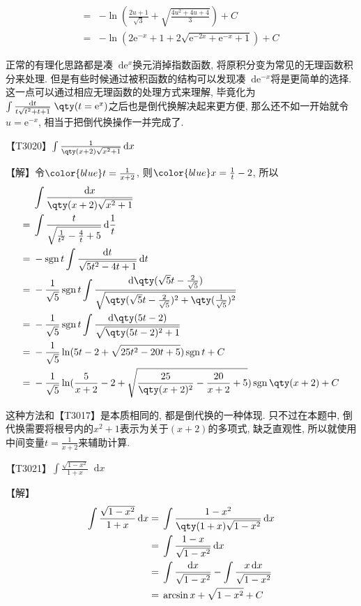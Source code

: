\documentclass{ctexbook}
\DeclareMathOperator{\sgn}{sgn}
\newcommand{\e}{\mathrm{e}}
\newcommand*{\dif}{\mathop{}\!\mathrm{d}}
\begin{document}
{\begin{align*}
={}&-\ln(\frac{2u+1}{\sqrt{3}}+\sqrt{\frac{4u^{2}+4u+4}{3}})+C\\
={}&-\ln(2\e^{-x}+1+2\sqrt{\e^{-2x}+\e^{-x}+1})+C
\end{align*}\par
{\kaishu 正常的有理化思路都是凑$\dif{\e^{x}}$换元消掉指数函数, 将原积分变为常见的无理函数积分来处理. 但是有些时候通过被积函数的结构可以发现凑$\dif{\e^{-x}}$将是更简单的选择. 这一点可以通过相应无理函数的处理方式来理解, 毕竟化为$\int\frac{\dif{t}}{t\sqrt{t^{2}+t+1}}\;\qty(t=\e^{x})$之后也是倒代换解决起来更方便, 那么还不如一开始就令$u=\e^{-x}$, 相当于把倒代换操作一并完成了. \par}
【T3020】$\int\frac{1}{\qty(x+2)\sqrt{x^{2}+1}}\dif{x}$\par
【解】令$\color{blue}t=\frac{1}{x+2}$, 则$\color{blue}x=\frac{1}{t}-2$, 所以
\begin{align*}
{}&\int\frac{\dif{x}}{\qty(x+2)\sqrt{x^{2}+1}}\\
={}&\int\frac{t}{\sqrt{\frac{1}{t^{2}}-\frac{4}{t}+5}}\dif{\frac{1}{t}}\\
={}&-\sgn{t}\int\frac{\dif{t}}{\sqrt{5t^{2}-4t+1}}\dif{t}\\
={}&-\frac{1}{\sqrt{5}}\sgn{t}\int\frac{\dif{\qty(\sqrt{5}t-\frac{2}{\sqrt{5}})}}{\sqrt{\qty(\sqrt{5}t-\frac{2}{\sqrt{5}})^{2}+\qty(\frac{1}{\sqrt{5}})^{2}}}\\
={}&-\frac{1}{\sqrt{5}}\sgn{t}\int\frac{\dif{\qty(5t-2)}}{\sqrt{\qty(5t-2)^{2}+1}}\\
={}&-\frac{1}{\sqrt{5}}\ln(5t-2+\sqrt{25t^{2}-20t+5})\sgn{t}+C\\
={}&-\frac{1}{\sqrt{5}}\ln(\frac{5}{x+2}-2+\sqrt{\frac{25}{\qty(x+2)^{2}}-\frac{20}{x+2}+5})\sgn{\qty(x+2)}+C
\end{align*}\par
{\kaishu 这种方法和{\color{red}【T3017】}是本质相同的, 都是倒代换的一种体现. 只不过在本题中, 倒代换需要将根号内的$x^{2}+1$表示为关于$(x+2)$的多项式, 缺乏直观性, 所以就使用中间变量$t=\frac{1}{x+2}$来辅助计算. \par}
【T3021】$\int\frac{\sqrt{1-x^{2}}}{1+x}\dif{x}$\par
【解】
\begin{align*}
\int\frac{\sqrt{1-x^{2}}}{1+x}\dif{x}={}&\int\frac{1-x^{2}}{\qty(1+x)\sqrt{1-x^{2}}}\dif{x}\\
={}&\int\frac{1-x}{\sqrt{1-x^{2}}}\dif{x}\\
={}&\int\frac{\dif{x}}{\sqrt{1-x^{2}}}-\int\frac{x\dif{x}}{\sqrt{1-x^{2}}}\\
={}&\arcsin{x}+\sqrt{1-x^{2}}+C

\end{align*}}
\end{document}
